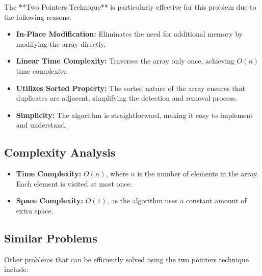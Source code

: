 The **Two Pointers Technique** is particularly effective for this problem due to the following reasons:

\begin{itemize}
    \item \textbf{In-Place Modification:} Eliminates the need for additional memory by modifying the array directly.
    \item \textbf{Linear Time Complexity:} Traverses the array only once, achieving \(O(n)\) time complexity.
    \item \textbf{Utilizes Sorted Property:} The sorted nature of the array ensures that duplicates are adjacent, simplifying the detection and removal process.
    \item \textbf{Simplicity:} The algorithm is straightforward, making it easy to implement and understand.
\end{itemize}

\subsection*{Complexity Analysis}
\begin{itemize}
    \item \textbf{Time Complexity:} \(O(n)\), where \(n\) is the number of elements in the array. Each element is visited at most once.
    \item \textbf{Space Complexity:} \(O(1)\), as the algorithm uses a constant amount of extra space.
\end{itemize}

\subsection*{Similar Problems}
Other problems that can be efficiently solved using the two pointers technique include:

